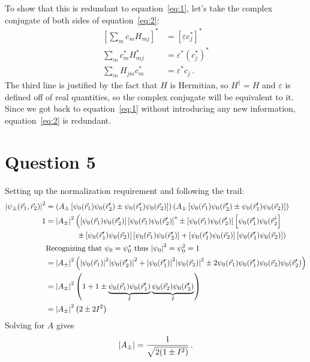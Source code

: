 \documentclass[11pt]{article}
\begin{document}
\begin{enumerate}[label=\alph*)]
To show that this is redundant to equation~\ref{eq:1}, let's take the complex conjugate of both sides of equation~\ref{eq:2}:
\begin{align*}
\left[\sum_{m}c_m H_{mj}\right]^* &= \left[\varepsilon c_j^*\right]^*\\
\sum_{m} c_m^* H_{mj}^* & = \varepsilon^* \left(c_j^*\right)^*\\
\sum_{m} H_{jm} c_m^* & = \varepsilon^* c_j \, .
\end{align*}
The third line is justified by the fact that $H$ is Hermitian, so $H^\dagger = H$ and $\varepsilon$ is defined off of real quantities, so the complex conjugate will be equivalent to it. Since we got back to equation~\ref{eq:1} without introducing any new information, equation~\ref{eq:2} is redundant.
\end{enumerate}

\newpage

\section*{Question 5}
Setting up the normalization requirement and following the trail:
\begin{align*}
\abs{\psi_\pm(\vec{r}_1, \vec{r}_2)}^2 & = \left(A_\pm \left[\psi_0(\vec{r}_1)\psi_0(\vec{r}_2^\prime)\pm \psi_0(\vec{r}_1^\prime)\psi_0(\vec{r}_2)\right]\right)\left(A_\pm \left[\psi_0(\vec{r}_1)\psi_0(\vec{r}_2^\prime)\pm \psi_0(\vec{r}_1^\prime)\psi_0(\vec{r}_2)\right]\right)\\
1 & = \abs{A_\pm}^2 \left(\left[\psi_0(\vec{r}_1)\psi_0(\vec{r}_2^\prime)\right]\left[\psi_0(\vec{r}_1)\psi_0(\vec{r}_2^\prime)\right]^* \pm \left[\psi_0(\vec{r}_1)\psi_0(\vec{r}_2^\prime)\right]\left[\psi_0(\vec{r}_1^\prime)\psi_0(\vec{r}_2^)\right] \right.\\
& \hspace{4em}\left. \pm \left[\psi_0(\vec{r}_1^\prime)\psi_0(\vec{r}_2)\right]\left[\psi_0(\vec{r}_1)\psi_0(\vec{r}_2^\prime)\right] + \left[\psi_0(\vec{r}_1^\prime)\psi_0(\vec{r}_2)\right]\left[\psi_0(\vec{r}_1^\prime)\psi_0(\vec{r}_2)\right]\right)\\
& \text{Recognizing that } \psi_0 = \psi_0^* \text{ thus } \abs{\psi_0}^2 = \psi_0^2 = 1\\
& = \abs{A_\pm}^2 \left(\abs{\psi_0(\vec{r}_1)}^2\abs{\psi_0(\vec{r}_2^\prime)}^2 + \abs{\psi_0(\vec{r}_1^\prime)}^2\abs{\psi_0(\vec{r}_2)}^2 \pm 2 \psi_0(\vec{r}_1)\psi_0(\vec{r}_1^\prime)\psi_0(\vec{r}_2)\psi_0(\vec{r}_2^\prime)\right)\\
& = \abs{A_\pm}^2\left(1 + 1 \pm \underbrace{\psi_0(\vec{r}_1)\psi_0(\vec{r}_1^\prime)}_I\underbrace{\psi_0(\vec{r}_2)\psi_0(\vec{r}_2^\prime)}_I \right)\\
& = \abs{A_\pm}^2\left(2 \pm 2I^2\right)
\end{align*}
Solving for $A$ gives
\[\abs{A_\pm} = \frac{1}{\sqrt{2(1 \pm I^2)}} \, .\]
\end{document}
